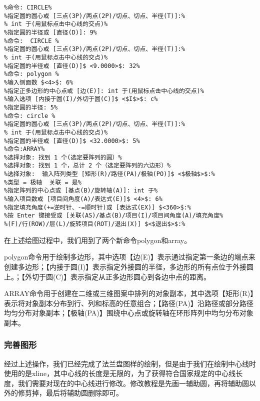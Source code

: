 \begin{lstlisting}
%命令: CIRCLE%
%指定圆的圆心或 [三点(3P)/两点(2P)/切点、切点、半径(T)]:%
% int 于(用鼠标点击中心线的交点)%
%指定圆的半径或 [直径(D)]: 9%
%命令:  CIRCLE %
%指定圆的圆心或 [三点(3P)/两点(2P)/切点、切点、半径(T)]:%
% int 于(用鼠标点击中心线的交点)%
%指定圆的半径或 [直径(D)]$ <9.0000>$: 32%
%命令: polygon %
%输入侧面数 $<4>$: 6%
%指定正多边形的中心点或 [边(E)]: int 于(用鼠标点击中心线的交点)%
%输入选项 [内接于圆(I)/外切于圆(C)]$ <$I$>$: c%
%指定圆的半径: 5%
%命令: circle %
%指定圆的圆心或 [三点(3P)/两点(2P)/切点、切点、半径(T)]:%
% int 于(用鼠标点击中心线的交点)%
%指定圆的半径或 [直径(D)]$ <32.0000>$: 5%
%命令:ARRAY%
%选择对象: 找到 1 个(选定要阵列的圆）%
%选择对象: 找到 1 个，总计 2 个（选定要阵列的六边形）%
%选择对象:  输入阵列类型 [矩形(R)/路径(PA)/极轴(PO)]$ <$极轴$>$:%
%类型 = 极轴  关联 = 是%
%指定阵列的中心点或 [基点(B)/旋转轴(A)]: int 于%
%输入项目数或 [项目间角度(A)/表达式(E)]$ <4>$: 6%
%指定填充角度(+=逆时针、-=顺时针)或 [表达式(EX)] $<360>$:%
%按 Enter 键接受或 [关联(AS)/基点(B)/项目(I)/项目间角度(A)/填充角度%
%(F)/行(ROW)/层(L)/旋转项目(ROT)/退出(X)] $<$退出$>$:%
\end{lstlisting}

在上述绘图过程中，我们用到了两个新命令polygon和array。

polygon命令用于绘制多边形，其中选项【边(E)】表示通过指定第一条边的端点来创建多边形；【内接于圆(I)】表示指定外接圆的半径，多边形的所有点位于外接圆上。；【外切于圆(C)】表示指定从正多边形圆心到各边中点的距离。

ARRAY命令用于创建在二维或三维图案中排列的对象副本，其中选项【矩形(R)】表示将对象副本分布到行、列和标高的任意组合；【路径(PA)】沿路径或部分路径均匀分布对象副本；【极轴(PA)】围绕中心点或旋转轴在环形阵列中均匀分布对象副本。

\subsubsection{完善图形}
经过上述操作，我们已经完成了法兰盘图样的绘制，但是由于我们在绘制中心线时使用的是xline，其中心线的长度是无限的，为了获得符合国家规定的中心线长度，我们需要对现在的中心线进行修改。修改教程是先画一辅助圆，再将辅助圆以外的修剪掉，最后将辅助圆删除即可。


